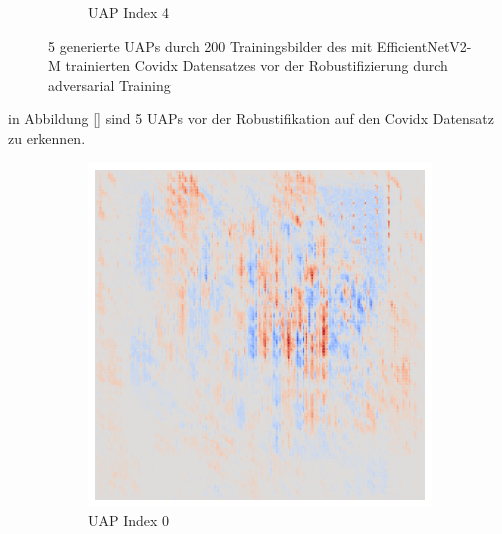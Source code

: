 \begin{figure}[ht!]
\begin{subfigure}{0.19\linewidth}
        \caption{UAP Index 4}
    \end{subfigure}
    \caption{5 generierte UAPs durch 200 Trainingsbilder des mit EfficientNetV2-M trainierten Covidx Datensatzes vor der Robustifizierung durch adversarial Training}
    \label{fig:uap-resnet18-covidx-rob0}
\end{figure}

in Abbildung \ref{} sind 5 UAPs vor der Robustifikation auf den Covidx Datensatz zu erkennen. 

\begin{figure}[ht!]
    \centering
    \begin{subfigure}{0.19\linewidth}
        \centering
        \includegraphics[height=1\linewidth]{01-images/05-resultate/uap_efficientnet/uap0-efficientnetv2m-mri-n200-robustificationslevel0.png}
        \caption{UAP Index 0}
    \end{subfigure}\hfill%
    \begin{subfigure}{0.19\linewidth}
        \centering

\end{subfigure}
\end{figure}
